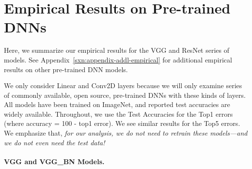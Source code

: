 \vspace{-2mm}

\section{Empirical Results on Pre-trained DNNs}
\label{sxn:emp}

\vspace{-1mm}

Here, we summarize our empirical results for the VGG and ResNet series of models.
See Appendix~\ref{sxn:appendix-addl-empirical} for additional empirical results on other pre-trained DNN models.

We only consider Linear and Conv2D layers because we will only examine series of commonly available, open source, pre-trained DNNs with these kinds of layers. 
All models have been trained on ImageNet, and reported test accuracies are widely available. 
Throughout, we use the Test Accuracies for the Top1 errors (where accuracy = 100 - top1 error).
We see similar results for the Top5 errors.
We emphasize that, \emph{for our analysis, we do not need to retrain these models---and we do not even need the test data!}

\paragraph{VGG and VGG\_BN Models.}

